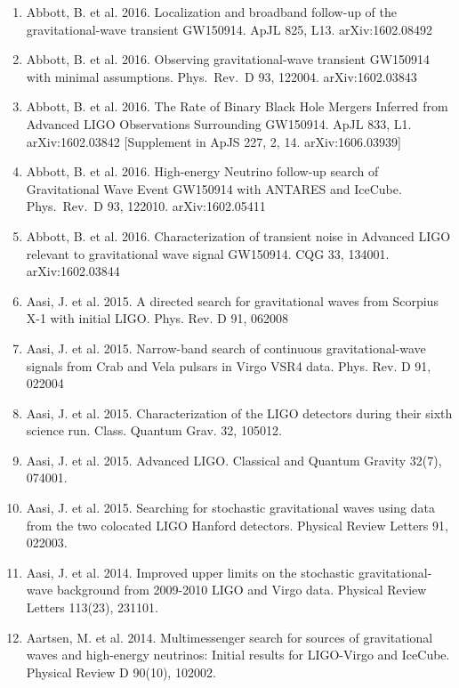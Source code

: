 \documentclass[margin,line]{res}
\begin{document}
\begin{resume}
\begin{enumerate}
\item Abbott, B. et al. 2016. Localization and broadband follow-up of the gravitational-wave transient GW150914.   ApJL 825, L13. arXiv:1602.08492

\item Abbott, B. et al. 2016. Observing gravitational-wave transient GW150914 with minimal assumptions.  Phys.~Rev.~D 93, 122004. arXiv:1602.03843

\item Abbott, B. et al. 2016. The Rate of Binary Black Hole Mergers Inferred from Advanced LIGO Observations Surrounding GW150914. ApJL 833, L1.  arXiv:1602.03842  [Supplement in ApJS 227, 2, 14. arXiv:1606.03939]

\item Abbott, B. et al. 2016.  High-energy Neutrino follow-up search of Gravitational Wave Event GW150914 with ANTARES and IceCube.   Phys.~Rev.~D 93, 122010. arXiv:1602.05411

\item Abbott, B. et al. 2016. Characterization of transient noise in Advanced LIGO relevant to gravitational wave signal GW150914.   CQG 33, 134001. arXiv:1602.03844

\item Aasi, J. et al. 2015. A directed search for gravitational waves from Scorpius X-1 with initial LIGO.  Phys. Rev. D 91, 062008

\item Aasi, J. et al. 2015. Narrow-band search of continuous gravitational-wave signals from Crab and Vela pulsars in Virgo VSR4 data.  Phys. Rev. D 91, 022004

\item Aasi, J. et al. 2015. Characterization of the LIGO detectors during their sixth science run. Class. Quantum Grav. 32, 105012.

\item Aasi, J. et al. 2015. Advanced LIGO. Classical and Quantum Gravity 32(7), 074001. 

\item Aasi, J. et al. 2015. Searching for stochastic gravitational waves using data from the two colocated LIGO Hanford detectors. Physical Review Letters 91, 022003. 

\item Aasi, J. et al. 2014. Improved upper limits on the stochastic gravitational-wave background from 2009-2010 LIGO and Virgo data. Physical Review Letters 113(23),  231101. 

\item Aartsen, M. et al. 2014. Multimessenger search for sources of gravitational waves and high-energy neutrinos: Initial results for LIGO-Virgo and IceCube. Physical Review D 90(10), 102002.


\end{enumerate}
\end{resume}
\end{document}
